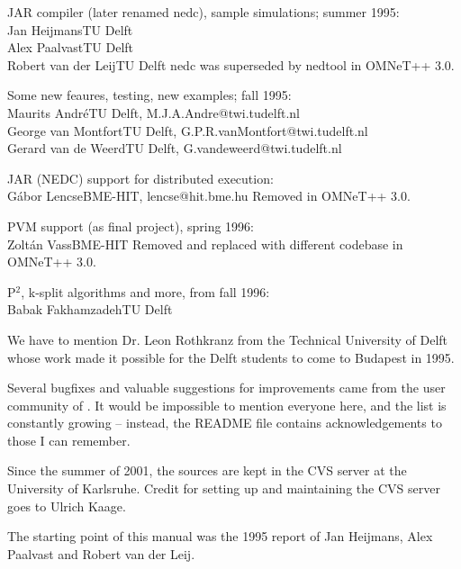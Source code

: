 JAR compiler (later renamed nedc), sample simulations; summer 1995:\\
\tab Jan Heijmans\tab \tab TU Delft\\
\tab Alex Paalvast\tab \tab TU Delft\\
\tab Robert van der Leij\tab TU Delft
nedc was superseded by nedtool in OMNeT++ 3.0.

Some new feaures, testing, new examples; fall 1995:\\
\tab Maurits Andr\'{e}\tab \tab TU Delft, M.J.A.Andre@twi.tudelft.nl\\
\tab George van Montfort\tab TU Delft, G.P.R.vanMontfort@twi.tudelft.nl\\
\tab Gerard van de Weerd\tab TU Delft, G.vandeweerd@twi.tudelft.nl

JAR (NEDC) support for distributed execution:\\
\tab G\'{a}bor Lencse\tab \tab BME-HIT, lencse@hit.bme.hu
Removed in OMNeT++ 3.0.

PVM support (as final project), spring 1996:\\
\tab Zolt\'{a}n Vass\tab \tab BME-HIT
Removed and replaced with different codebase in OMNeT++ 3.0.

P$^{2}$, k-split algorithms and more, from fall 1996:\\
\tab Babak Fakhamzadeh\tab TU Delft


We have to mention Dr. Leon Rothkranz from the Technical University
of Delft whose work made it possible for the Delft students to
come to Budapest in 1995.

Several bugfixes and valuable suggestions for improvements came
from the user community of {\opp}. It would be impossible to
mention everyone here, and the list is constantly growing --
instead, the README file contains acknowledgements to those I
can remember.

Since the summer of 2001, the {\opp} sources are kept in the
CVS server at the University of Karlsruhe. Credit for setting
up and maintaining the CVS server goes to Ulrich Kaage.

The starting point of this manual was the 1995 report of Jan
Heijmans, Alex Paalvast and Robert van der Leij.

